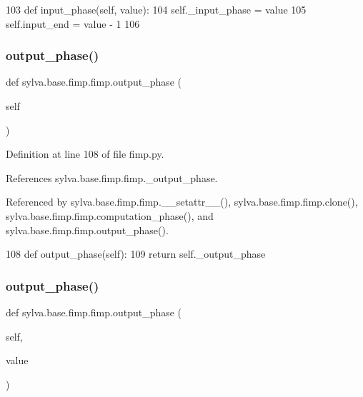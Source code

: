 \begin{DoxyCode}
103     \textcolor{keyword}{def }input\_phase(self, value):
104       self.\_input\_phase = value
105       self.input\_end = value - 1
106 
\end{DoxyCode}
\mbox{\label{classsylva_1_1base_1_1fimp_1_1fimp_a68104c1d9ec8694b25660128fa6497a0}} 
\subsubsection{\texorpdfstring{output\+\_\+phase()}{output\_phase()}\hspace{0.1cm}{\footnotesize\ttfamily [1/2]}}
{\footnotesize\ttfamily def sylva.\+base.\+fimp.\+fimp.\+output\+\_\+phase (\begin{DoxyParamCaption}\item[{}]{self }\end{DoxyParamCaption})}



Definition at line 108 of file fimp.\+py.



References sylva.\+base.\+fimp.\+fimp.\+\_\+output\+\_\+phase.



Referenced by sylva.\+base.\+fimp.\+fimp.\+\_\+\+\_\+setattr\+\_\+\+\_\+(), sylva.\+base.\+fimp.\+fimp.\+clone(), sylva.\+base.\+fimp.\+fimp.\+computation\+\_\+phase(), and sylva.\+base.\+fimp.\+fimp.\+output\+\_\+phase().


\begin{DoxyCode}
108     \textcolor{keyword}{def }output\_phase(self):
109         \textcolor{keywordflow}{return} self.\_output\_phase
\end{DoxyCode}
\mbox{\label{classsylva_1_1base_1_1fimp_1_1fimp_a40756aeb1892d118aa4649c5f6251970}} 
\subsubsection{\texorpdfstring{output\+\_\+phase()}{output\_phase()}\hspace{0.1cm}{\footnotesize\ttfamily [2/2]}}
{\footnotesize\ttfamily def sylva.\+base.\+fimp.\+fimp.\+output\+\_\+phase (\begin{DoxyParamCaption}\item[{}]{self,  }\item[{}]{value }\end{DoxyParamCaption})}



